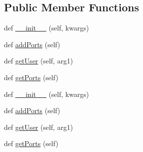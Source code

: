 \subsection*{Public Member Functions}
\begin{DoxyCompactItemize}
\item 
def \hyperlink{classGUI8_1_1Setting_a777bd294027ee83a8e577db4c4653e36}{\+\_\+\+\_\+init\+\_\+\+\_\+} (self, kwargs)
\item 
def \hyperlink{classGUI8_1_1Setting_ae85ded752f2e724dc327e515bad65b24}{add\+Ports} (self)
\item 
def \hyperlink{classGUI8_1_1Setting_abf9d205f088d416b5e1f64e73564c223}{get\+User} (self, arg1)
\item 
def \hyperlink{classGUI8_1_1Setting_ab300a0b2c2439516a9aa85e180f280f3}{get\+Ports} (self)
\item 
def \hyperlink{classGUI8_1_1Setting_a777bd294027ee83a8e577db4c4653e36}{\+\_\+\+\_\+init\+\_\+\+\_\+} (self, kwargs)
\item 
def \hyperlink{classGUI8_1_1Setting_ae85ded752f2e724dc327e515bad65b24}{add\+Ports} (self)
\item 
def \hyperlink{classGUI8_1_1Setting_abf9d205f088d416b5e1f64e73564c223}{get\+User} (self, arg1)
\item 
def \hyperlink{classGUI8_1_1Setting_ab300a0b2c2439516a9aa85e180f280f3}{get\+Ports} (self)
\end{DoxyCompactItemize}
